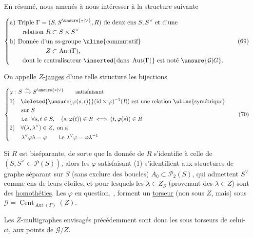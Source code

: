 
En résumé, nous  amenés à nous intéresser à la structure suivante

\[
\left\{\begin{aligned}
&\text{a) Triple }\Gamma=(S,S^{\unsure{*|\vee}},R)\ \text{de deux ens }S,S^\vee\ \text{et d'une}\\
&\qquad \text{relation }R\subset S\times S^\vee\\
&\text{b) Donnée d'un ss-groupe \uline{commutatif}}\\
&\hspace{20mm}Z\subset\operatorname{Aut}(\Gamma),\\
&\qquad\text{dont le centralisateur }\inserted{\text{dans }\operatorname{Aut}(\Gamma)}\ \text{est noté }\unsure{\mathcal G|G}.
\end{aligned}\right. \tag*{(69)}
\]


On appelle \uline{$Z$-jauges} d'une telle structure les  bijections

\[
\left\{\begin{aligned}
&\varphi:S\xrightarrow{\sim} S^{\unsure{*|\vee}}\qquad\text{satisfaisant}\\
&1)\quad\deleted{\unsure{\varphi(s,t)}}(\mathrm{id}\times\varphi)^{-1}(R)\ \text{est une relation \uline{symétrique}}\\
&\qquad\text{sur }S\\
&\qquad\text{i.e. }\forall s,t\in S,\quad(s,\varphi(t))\in R\iff(t,\varphi(s))\in R\\
&2)\quad\forall(\lambda,\lambda^\vee)\in Z,\ \text{on a}\\
&\qquad\lambda^\vee\varphi\lambda=\varphi\qquad\text{i.e }\lambda^\vee\varphi=\varphi\lambda^{-1}
\end{aligned}\right. \tag*{(70)}
\]

Si $R$ est biséparante, de sorte que  la donnée de $R$ s'identifie à celle de $(S,S^\vee\subset\mathscr P(S))$, alors les $\varphi$ satisfaisant (1) s'identifient aux structures de graphe   séparant sur $S$ (sans exclure des boucles) $A_0\subset\mathscr P_2(S)$, qui admettent $S^\vee$ comme ens de leurs étoiles, et pour lesquels les $\lambda\in Z_S$ (provenant des $\lambda\in Z$) sont des \uline{homothéties}.  Les $\varphi$ en question, , forment un \uline{torseur} (non sous $Z$, mais) sous $\mathcal G=\operatorname{Cent}_{\operatorname{Aut}(\Gamma)}(Z)$.

Les $Z$-multigraphes envisagés précédemment sont donc les sous torseurs de celui-ci,   aux points de $\mathcal G/Z$.


